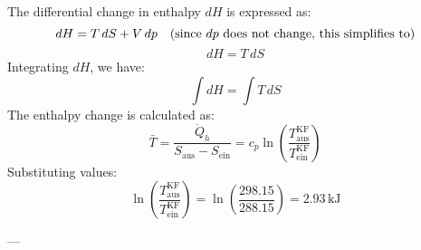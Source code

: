 The differential change in enthalpy \( dH \) is expressed as:  
\[
dH = T \, dS + V \, dp \quad \text{(since \( dp \) does not change, this simplifies to)}
\]  
\[
dH = T \, dS
\]  
Integrating \( dH \), we have:  
\[
\int dH = \int T \, dS
\]  
The enthalpy change is calculated as:  
\[
\bar{T} = \frac{\dot{Q}_h}{S_{\text{aus}} - S_{\text{ein}}} = c_p \ln \left( \frac{T_{\text{aus}}^{\text{KF}}}{T_{\text{ein}}^{\text{KF}}} \right)
\]  
Substituting values:  
\[
\ln \left( \frac{T_{\text{aus}}^{\text{KF}}}{T_{\text{ein}}^{\text{KF}}} \right) = \ln \left( \frac{298.15}{288.15} \right) = 2.93 \, \text{kJ}
\]

---